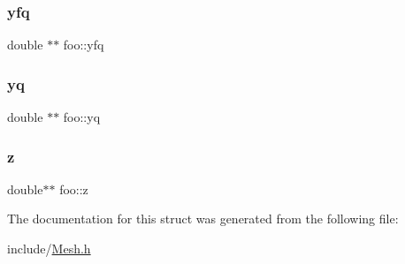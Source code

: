 \mbox{\label{structfoo_a97add37b674ff45f064f27235667dc7a}} 
\subsubsection{\texorpdfstring{yfq}{yfq}}
{\footnotesize\ttfamily double $\ast$$\ast$ foo\+::yfq}

\mbox{\label{structfoo_aa6ae1b8d3eae8c0c3326c02cae2fdafe}} 
\subsubsection{\texorpdfstring{yq}{yq}}
{\footnotesize\ttfamily double $\ast$$\ast$ foo\+::yq}

\mbox{\label{structfoo_a07a5b33f3b6f1b2bd8db834cf5472fdd}} 
\subsubsection{\texorpdfstring{z}{z}}
{\footnotesize\ttfamily double$\ast$$\ast$ foo\+::z}



The documentation for this struct was generated from the following file\+:\begin{DoxyCompactItemize}
\item 
include/\hyperlink{_mesh_8h}{Mesh.\+h}\end{DoxyCompactItemize}
